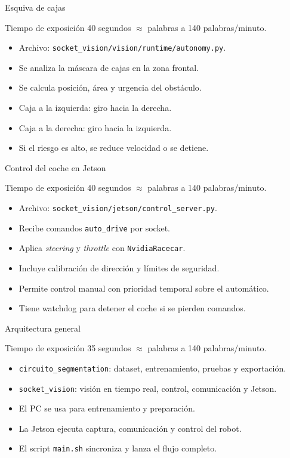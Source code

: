 \documentclass[aspectratio=169]{beamer}
\newcommand{\timing}[2]{%
  \begin{block}{Tiempo de exposici\'on}
  \small #1 segundos \quad $\approx$ \quad #2 palabras a 140 palabras/minuto.
  \end{block}
}
\begin{document}
\begin{frame}{Esquiva de cajas}
\timing{40}{93}
\begin{itemize}
  \item Archivo: \texttt{socket\_vision/vision/runtime/autonomy.py}.
  \item Se analiza la m\'ascara de cajas en la zona frontal.
  \item Se calcula posici\'on, \'area y urgencia del obst\'aculo.
  \item Caja a la izquierda: giro hacia la derecha.
  \item Caja a la derecha: giro hacia la izquierda.
  \item Si el riesgo es alto, se reduce velocidad o se detiene.
\end{itemize}
\end{frame}

\begin{frame}{Control del coche en Jetson}
\timing{40}{93}
\begin{itemize}
  \item Archivo: \texttt{socket\_vision/jetson/control\_server.py}.
  \item Recibe comandos \texttt{auto\_drive} por socket.
  \item Aplica \textit{steering} y \textit{throttle} con \texttt{NvidiaRacecar}.
  \item Incluye calibraci\'on de direcci\'on y l\'imites de seguridad.
  \item Permite control manual con prioridad temporal sobre el autom\'atico.
  \item Tiene watchdog para detener el coche si se pierden comandos.
\end{itemize}
\end{frame}

\begin{frame}{Arquitectura general}
\timing{35}{82}
\begin{itemize}
  \item \texttt{circuito\_segmentation}: dataset, entrenamiento, pruebas y exportaci\'on.
  \item \texttt{socket\_vision}: visi\'on en tiempo real, control, comunicaci\'on y Jetson.
  \item El PC se usa para entrenamiento y preparaci\'on.
  \item La Jetson ejecuta captura, comunicaci\'on y control del robot.
  \item El script \texttt{main.sh} sincroniza y lanza el flujo completo.
\end{itemize}
\end{frame}
\end{document}
